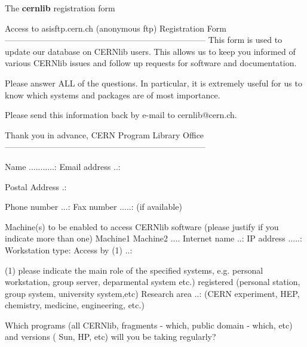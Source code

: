 \begin{XMPt}{The {\bf cernlib} registration form}

              Access to asisftp.cern.ch (anonymous ftp)
                        Registration Form
------------------------------------------------------------------------
This form is used to update our database on CERNlib users. This allows us
to keep you informed of various CERNlib issues and follow up requests for
software and documentation.  

Please answer ALL of the questions. In particular, it is extremely useful
for us to know which systems and packages are of most importance.

Please send this information back by e-mail to cernlib@cern.ch.
 
Thank you in advance, CERN Program Library Office
------------------------------------------------------------------------
 
 Name ...........:
 Email address ..:
 
 Postal Address .:
 
 
 
 Phone number ...:
 Fax number .....:                      (if available)
 
 Machine(s) to be enabled to access CERNlib software (please justify if
 you indicate more than one)
                          Machine1          Machine2     ....
 Internet name ..:
 IP address .....:
 Workstation type:
 Access by (1) ..:
 
    (1) please indicate the main role of the specified systems, e.g.
        personal workstation, group server, deparmental system etc.)
        registered (personal station, group system, university system,etc)
 Research area ..:
  (CERN experiment, HEP, chemistry, medicine, engineering, etc.)
 
 Which programs (all CERNlib, fragments - which, public domain - which,
 etc) and versions ( Sun, HP, etc) will you be taking regularly?
 
\end{XMPt}

